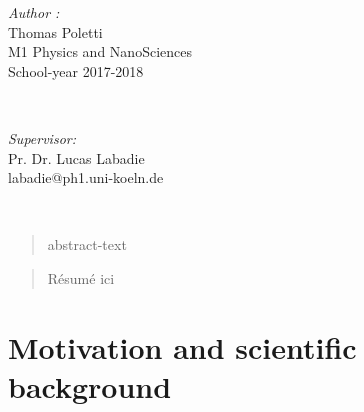 \documentclass[a4paper,twoside,11pt]{article}
\makeatletter
\newcommand\frontmatter{%
    \clearpage
  \pagenumbering{roman}}
\newcommand\mainmatter{%
    \clearpage
  \pagenumbering{arabic}}
\makeatother
\begin{document}
\begin{titlepage}
	
	\begin{minipage}{0.4\textwidth}
		\begin{flushleft} \large
			\emph{Author :} \\
			Thomas Poletti\\
          M1 Physics and NanoSciences\\
          School-year 2017-2018\\
			\end{flushleft}
			\end{minipage}~
			\begin{minipage}{0.4\textwidth}
            
			\begin{flushright} \large
   			\emph{Supervisor:}\\
			Pr. Dr. Lucas Labadie\\
            labadie@ph1.uni-koeln.de\\
		\end{flushright}
        
	\end{minipage}\\[2 cm]
	
    
    
	
\end{titlepage}

\frontmatter
\begin{abstract}
   abstract-text
\end{abstract}
\renewcommand{\abstractname}{Résumé}
\newpage
\begin{abstract}
   Résumé ici
\end{abstract}
\renewcommand{\abstractname}{Introduction}

\newpage
\tableofcontents
\listoffigures
\listoftables

\clearpage

\mainmatter

\begin{abstract}

\end{abstract}


\section{Motivation and scientific background}

\end{document}
